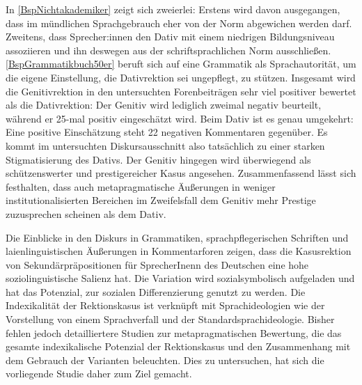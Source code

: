 In \autoref{BspNichtakademiker} zeigt sich zweierlei: 
Erstens wird davon ausgegangen, dass im mündlichen Sprachgebrauch eher von der Norm abgewichen werden darf. 
Zweitens, dass Sprecher:innen den Dativ mit einem niedrigen Bildungsniveau assoziieren und ihn deswegen aus der schriftsprachlichen Norm ausschließen.
\autoref{BspGrammatikbuch50er} beruft sich auf eine Grammatik als Sprachautorität, um die eigene Einstellung, die Dativrektion sei \glqq ungepflegt\grqq, zu stützen. 
Insgesamt wird die Genitivrektion in den untersuchten Forenbeiträgen sehr viel positiver bewertet als die Dativrektion:
Der Genitiv wird lediglich zweimal negativ beurteilt, während er 25-mal positiv eingeschätzt wird. 
Beim Dativ ist es genau umgekehrt:
Eine positive Einschätzung steht 22 negativen Kommentaren gegenüber. 
Es kommt im untersuchten Diskursausschnitt also tatsächlich zu einer starken Stigmatisierung des Dativs. 
Der Genitiv hingegen wird überwiegend als schützenswerter und prestigereicher Kasus angesehen.
Zusammenfassend lässt sich festhalten, dass auch metapragmatische Äußerungen in weniger institutionalisierten Bereichen im Zweifelsfall dem Genitiv mehr Prestige zuzusprechen scheinen als dem Dativ.

Die Einblicke in den Diskurs in Grammatiken, sprachpflegerischen Schriften und laienlinguistischen Äußerungen in Kommentarforen zeigen, dass die Kasusrektion von Sekundärpräpositionen für SprecherInenn des Deutschen eine hohe soziolinguistische Salienz hat. 
Die Variation wird sozialsymbolisch aufgeladen und hat das Potenzial, zur sozialen Differenzierung genutzt zu werden. 
Die Indexikalität der Rektionskasus ist verknüpft mit Sprachideologien wie der Vorstellung von einem Sprachverfall und der Standardsprachideologie. 
Bisher fehlen jedoch detailliertere Studien zur metapragmatischen Bewertung, die das gesamte indexikalische Potenzial der Rektionskasus und den Zusammenhang mit dem Gebrauch der Varianten  beleuchten. 
Dies zu untersuchen, hat sich die vorliegende Studie daher zum Ziel gemacht. 

